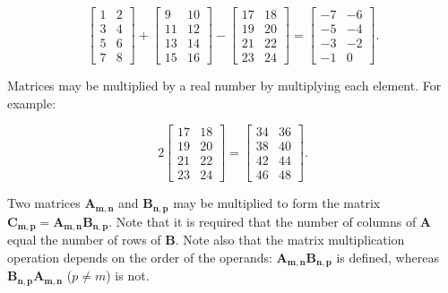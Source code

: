\begin{equation}
\label{eq:cmct0:smtp0:smop0:02}
\left[ \begin{array}{cc}
1 & 2 \\
3 & 4 \\
5 & 6 \\
7 & 8
\end{array}\right]
+
\left[ \begin{array}{cc}
9  &  10 \\
11 &  12 \\
13 &  14 \\
15 &  16
\end{array}\right]
-
\left[ \begin{array}{cc}
17 & 18 \\
19 & 20 \\
21 & 22 \\
23 & 24
\end{array}\right] 
=
\left[ \begin{array}{cc}
-7 & -6 \\
-5 & -4 \\
-3 & -2 \\
-1 & 0
\end{array}\right]
.
\end{equation}

Matrices may be multiplied by a real number by multiplying each element.  For example:

\begin{equation}
\label{eq:cmct0:smtp0:smop0:03}
2 \left[ \begin{array}{cc}
17 & 18 \\
19 & 20 \\
21 & 22 \\
23 & 24
\end{array}\right] 
=
\left[ \begin{array}{cc}
34 & 36 \\
38 & 40 \\
42 & 44 \\
46 & 48
\end{array}\right]
.
\end{equation}

Two matrices $\boldsymbol{A_{m,n}}$ and $\boldsymbol{B_{n,p}}$ may be multiplied
to form the matrix $\boldsymbol{C_{m,p}} = \boldsymbol{A_{m,n}} \boldsymbol{B_{n,p}}$.
Note that it is required that the number of columns of $\boldsymbol{A}$ equal the
number of rows of $\boldsymbol{B}$.  Note also that the matrix multiplication operation
depends on the order of the operands:  $\boldsymbol{A_{m,n}} \boldsymbol{B_{n,p}}$ is
defined, whereas $\boldsymbol{B_{n,p}}\boldsymbol{A_{m,n}}$ ($p \neq m$) is not.

